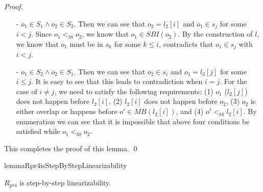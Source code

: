 \begin {proof}
\begin{itemize}
\setlength{\itemsep}{0.5pt}
\item[-] $o_1 \in S_1 \wedge o_2 \in S_2$. Then we can see that $o_2=l_2[i]$ and $o_1 \in s_j$ for some $i < j$. Since $o_1 <_{hb} o_2$, we know that $o_1 \in \textit{SBI}(o_2)$. By the construction of $l$, we know that $o_1$ must be in $s_k$ for some $k \leq i$, contradicts that $o_1 \in s_j$ with $i < j$.

\item[-] $o_1 \in S_2 \wedge o_2 \in S_1$. Then we can see that $o_2 \in s_i$ and $o_1 = l_2[j]$ for some $i \leq j$. It is easy to see that this leads to contradiction when $i = j$. For the case of $i \neq j$, we need to satisfy the following requirements: (1) $o_1$ ($l_2[j]$) does not happen before $l_2[i]$, (2) $l_2[i]$ does not happen before $o_2$, (3) $o_2$ is either overlap or happens before $o' \in \textit{MB}(l_2[i])$, and (4) $o' <_{hb} l_2[i]$. By enumeration we can see that it is impossible that above four conditions be satisfied while $o_1 <_{hb} o_2$.
\end{itemize}

This completes the proof of this lemma. \qed
\end {proof}





\begin{restatable}{lemma}{Rpr4isStepByStepLinearizability}
\label{lemma:Rpr4 is step-by-step linearizability}

$R_{\textit{pr4}}$ is step-by-step linearizability.

\end{restatable}

